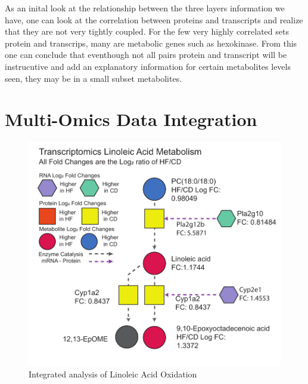 \documentclass[a4paper]{book}
\begin{document}
	
	As an inital look at the relationship between the three layers information we have, one can look at the correlation between proteins and transcripts and realize that they are not very tightly coupled. For the few very highly correlated sets protein and transcrips, many are metabolic genes such as hexokinase. From this one can conclude that eventhough not all pairs protein and transcript will be instrucutive and add an explanatory information for certain metabolites levels seen, they may be in a small subset metabolites. 
	
	\section{ Multi-Omics Data Integration }

\begin{figure}[hb!]
		\centering
		\includegraphics[width=\linewidth]{3.Trancriptomics/Integrated_Linoic_Acid}
		\caption{Integrated analysis of Linoleic Acid Oxidation}
		\label{fig: Integrated Model of Linoleic Acid Oxidation}
\end{figure}
\end{document}

